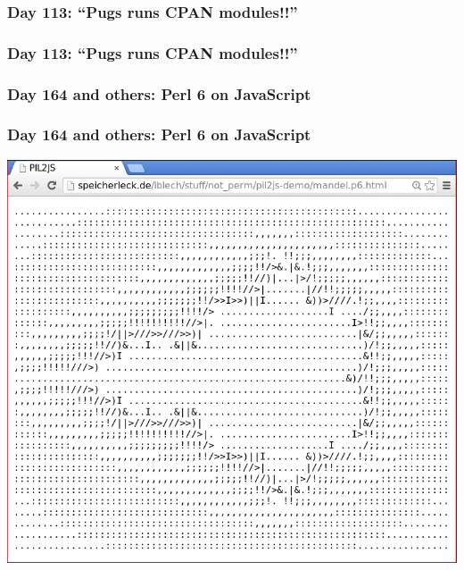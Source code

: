 \documentclass[12pt,compress,english,utf8,t]{beamer}
\newcommand{\inputminted}[2]{}
\begin{document}
\subsubsection{Day 113: ``Pugs runs CPAN modules!!''}

\begin{frame}[label=pugs-cpan]\frametitle{Day 113: ``Pugs runs CPAN
modules!!''}

  \inputminted{perl}{code-snippets/day113-pugs-cpan.pl}
\end{frame}

\subsubsection{Day 164 and others: Perl 6 on JavaScript}
\begin{frame}[label=pil2js]\frametitle{Day 164 and others: Perl 6 on JavaScript}
  \begin{center}\includegraphics[scale=0.25]{images/mandel-in-the-browser}\end{center}

  \inputminted{perl}{code-snippets/day193-jsan.pl}
\end{frame}
\end{document}
